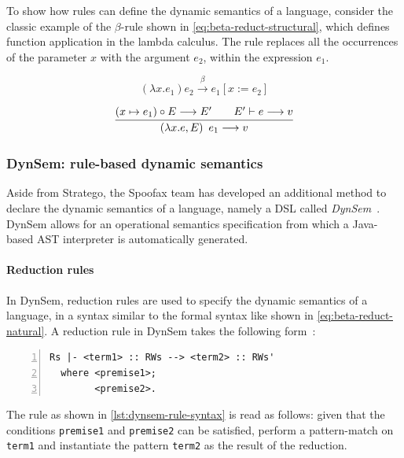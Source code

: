 To show how rules can define the dynamic semantics of a language, consider the
classic example of the \(\beta\)-rule shown in \cref{eq:beta-reduct-structural},
which defines function application in the lambda calculus. The rule replaces all
the occurrences of the parameter \(x\) with the argument \(e_2\), within the
expression \(e_1\).

\begin{equation}\label{eq:beta-reduct-structural}
(\lambda x.e_1) e_2 \xrightarrow{\beta} e_1[x := e_2]
\end{equation}

\begin{equation*}\label{eq:beta-reduct-natural}
\infer{%
    \left(\lambda x.e, E\right)~e_1 \longrightarrow v%
  }{%
    (x \mapsto e_1) \circ E \longrightarrow E' &\quad E' \vdash e \longrightarrow v
}
\end{equation*}

\subsubsection{DynSem: rule-based dynamic semantics}
\label{ssec:dynsem}
Aside from Stratego, the Spoofax team has developed an additional
method to declare the dynamic semantics of a language, namely a DSL
called \emph{DynSem}~\cite{VerguNV15}. DynSem allows for an operational
semantics specification from which a Java-based AST interpreter is
automatically generated.

\paragraph{Reduction rules} In DynSem, reduction rules are used to specify the
dynamic semantics of a language, in a syntax similar to the formal syntax like
shown in \cref{eq:beta-reduct-natural}. A reduction rule in DynSem takes the
following form~\cite{VerguNV15}:

\begin{minipage}[t]{\linewidth}
\begin{lstlisting}[language=dynsem,numbers=left,caption={The syntactic structure
of a reduction rule in DynSem.},label={lst:dynsem-rule-syntax}]
  Rs |- <term1> :: RWs --> <term2> :: RWs'
  where <premise1>;
        <premise2>.
\end{lstlisting}
\end{minipage}

The rule as shown in \cref{lst:dynsem-rule-syntax} is read as follows: given
that the conditions \texttt{premise1} and \texttt{premise2} can be satisfied,
perform a pattern-match on \texttt{term1} and instantiate the pattern
\texttt{term2} as the result of the reduction.


